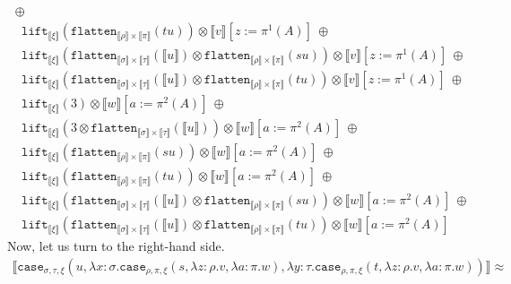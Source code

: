 \documentclass[a4paper,UKenglish,cleveref,autoref,numberwithinsect]{lipics-v2019}
\theoremstyle{definition}
\newcommand{\abs}[2]{\lambda #1.#2}
\newcommand{\flatten}{\mathtt{flatten}}
\newcommand{\lift}{\mathtt{lift}}
\newcommand{\typeinterpret}[1]{\llbracket #1 \rrbracket}
\newcommand{\interpret}[1]{\llbracket #1 \rrbracket}
\begin{document}
\begin{itemize}
\[\begin{array}{l}
    \ \oplus\\
  \phantom{A}
    \lift_{\typeinterpret{\xi}}(\flatten_{\typeinterpret{\rho} \times
    \typeinterpret{\pi}}(tu)) \otimes
     \interpret{v}[z:=\pi^1(A)]
    \ \oplus \\
  \phantom{A}
    \lift_{\typeinterpret{\xi}}(\flatten_{\typeinterpret{\sigma} \times
    \typeinterpret{\tau}}(\interpret{u}) \otimes
    \flatten_{\typeinterpret{\rho} \times \typeinterpret{\pi}}(su))
    \otimes
     \interpret{v}[z:=\pi^1(A)]
    \ \oplus \\
  \phantom{A}
    \lift_{\typeinterpret{\xi}}(\flatten_{\typeinterpret{\sigma} \times
    \typeinterpret{\tau}}(\interpret{u}) \otimes
    \flatten_{\typeinterpret{\rho} \times \typeinterpret{\pi}}(tu))
    \otimes
     \interpret{v}[z:=\pi^1(A)]
    \ \oplus \\
  \phantom{A}
    \lift_{\typeinterpret{\xi}}(3) \otimes \interpret{w}[a:=\pi^2(A)]
    \ \oplus \\
  \phantom{A}
    \lift_{\typeinterpret{\xi}}(3 \otimes
    \flatten_{\typeinterpret{\sigma} \times \typeinterpret{\tau}}(
    \interpret{u})) \otimes
    \interpret{w}[a:=\pi^2(A)]
    \ \oplus \\
  \phantom{A}
    \lift_{\typeinterpret{\xi}}(\flatten_{\typeinterpret{\rho} \times
    \typeinterpret{\pi}}(su)) \otimes
    \interpret{w}[a:=\pi^2(A)]
    \ \oplus\\
  \phantom{A}
    \lift_{\typeinterpret{\xi}}(\flatten_{\typeinterpret{\rho} \times
    \typeinterpret{\pi}}(tu)) \otimes
    \interpret{w}[a:=\pi^2(A)]
    \ \oplus \\
  \phantom{A}
    \lift_{\typeinterpret{\xi}}(\flatten_{\typeinterpret{\sigma} \times
    \typeinterpret{\tau}}(\interpret{u}) \otimes
    \flatten_{\typeinterpret{\rho} \times \typeinterpret{\pi}}(su))
    \otimes
    \interpret{w}[a:=\pi^2(A)]
    \ \oplus \\
  \phantom{A}
    \lift_{\typeinterpret{\xi}}(\flatten_{\typeinterpret{\sigma} \times
    \typeinterpret{\tau}}(\interpret{u}) \otimes
    \flatten_{\typeinterpret{\rho} \times \typeinterpret{\pi}}(tu))
    \otimes
    \interpret{w}[a:=\pi^2(A)]
  \end{array}
  \]
  Now, let us turn to the right-hand side.
  \[
  \begin{array}{l}
  \interpret{\mathtt{case}_{\sigma,\tau,\xi}(u,\abs{x:\sigma}{
  \mathtt{case}_{\rho,\pi,\xi}(s,\abs{z:\rho}{v},\abs{a:\pi}{w})},
  \abs{y:\tau}{\mathtt{case}_{\rho,\pi,\xi}(t,\abs{z:\rho}{v},\abs{a:
  \pi}{w})})} \approx \\

\end{array}\]
\end{itemize}
\end{document}
